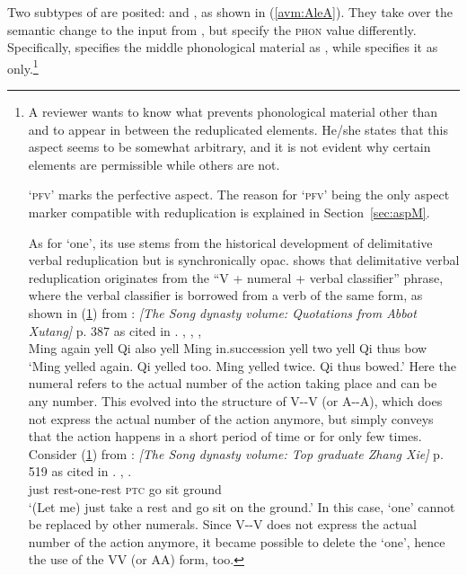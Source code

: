 Two subtypes of  are posited:
and , as shown in (\ref{avm:AleA}). %
They take over the semantic change to the input from , but specify the \textsc{phon} value differently.
Specifically,  specifies the middle phonological material as
, while  specifies it as  only.\footnote{
A reviewer wants to know what prevents phonological material other than  and  to appear in between the reduplicated elements.
He/she states that this aspect seems to be somewhat arbitrary, and it is not evident why certain elements are permissible while others are not.

 `\textsc{pfv}' marks the perfective aspect.
The reason for  `\textsc{pfv}' being the only aspect marker compatible with reduplication is explained in Section~\ref{sec:aspM}.

As for  `one', its use stems from the historical development of delimitative verbal reduplication but is synchronically opac.
\citet[13--15]{Zhang2000} shows that delimitative verbal reduplication originates from the ``V + numeral + verbal classifier'' phrase,
where the verbal classifier is borrowed from a verb of the same form, as shown in (\ref{ex:hist1}) from  :    \textit{[The Song dynasty volume: Quotations from Abbot Xutang]} p. 387 as cited in \citet[12]{Zhang2000}.
\ea\label{ex:hist1}
\gll {}  ,   ,     ,   \\
Ming again yell Qi also yell Ming in.succession yell two yell Qi thus bow\\
\glt `Ming yelled again. Qi yelled too. Ming yelled twice. Qi thus bowed.'
\z
Here the numeral refers to the actual number of the action taking place
and can be any number.
This evolved into the structure of V--V (or A--A), which does not express the actual number of the action anymore,
but simply conveys that the action happens in a short period of time or for only few times. 
Consider (\ref{ex:hist2}) from  :    \textit{[The Song dynasty volume: Top graduate Zhang Xie]} p. 519 as cited in \citet[13]{Zhang2000}.
\ea\label{ex:hist2}
\gll {}  ,   .\\
just rest-one-rest \textsc{ptc} go sit ground\\
\glt `(Let me) just take a rest and go sit on the ground.'
\z
In this case,  `one' cannot be replaced by other numerals.
Since V--V does not express the actual number of the action anymore,
it became possible to delete the  `one',
hence the use of the VV (or AA) form, too.

}
